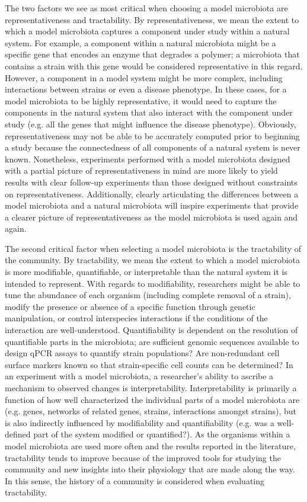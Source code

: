 \documentclass[11pt,twocolumn,notitlepage,openany,twoside]{book}
\begin{document}
\begin{refsection}
The two factors we see as most critical when choosing a model microbiota are representativeness and tractability. By representativeness, we mean the extent to which a model microbiota captures a component under study within a natural system. For example, a component within a natural microbiota might be a specific gene that encodes an enzyme that degrades a polymer; a microbiota that contains a strain with this gene would be considered representative in this regard. However, a component in a model system might be more complex, including interactions between strains or even a disease phenotype. In these cases, for a model microbiota to be highly representative, it would need to capture the components in the natural system that also interact with the component under study (e.g. all the genes that might influence the disease phenotype). Obviously, representativeness may not be able to be accurately computed prior to beginning a study because the connectedness of all components of a natural system is never known. Nonetheless, experiments performed with a model microbiota designed with a partial picture of representativeness in mind are more likely to yield results with clear follow-up experiments than those designed without constraints on representativeness. Additionally, clearly articulating the differences between a model microbiota and a natural microbiota will inspire experiments that provide a clearer picture of representativeness as the model microbiota is used again and again.

The second critical factor when selecting a model microbiota is the tractability of the community. By tractability, we mean the extent to which a model microbiota is more modifiable, quantifiable, or interpretable than the natural system it is intended to represent. With regards to modifiability, researchers might be able to tune the abundance of each organism (including complete removal of a strain), modify the presence or absence of a specific function through genetic manipulation, or control interspecies interactions if the conditions of the interaction are well-understood. Quantifiability is dependent on the resolution of quantifiable parts in the microbiota; are sufficient genomic sequences available to design qPCR assays to quantify strain populations? Are non-redundant cell surface markers known so that strain-specific cell counts can be determined? In an experiment with a model microbiota, a researcher’s ability to ascribe a mechanism to observed changes is interpretability. Interpretability is primarily a function of how well characterized the individual parts of a model microbiota are (e.g. genes, networks of related genes, strains, interactions amongst strains), but is also indirectly influenced by modifiability and quantifiability (e.g. was a well-defined part of the system modified or quantified?). As the organisms within a model microbiota are used more often and the results reported in the literature, tractability tends to improve because of the improved tools for studying the community and new insights into their physiology that are made along the way. In this sense, the history of a community is considered when evaluating tractability.


\end{refsection}
\end{document}
